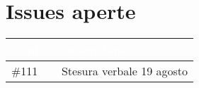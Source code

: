\documentclass{classes/base}
\begin{document}
    \section*{Issues aperte}
    {
        
        \newlength{\freewidth}
        \setlength{\freewidth}{\dimexpr\textwidth-10\tabcolsep}
        \renewcommand{\arraystretch}{1.5}
        \centering
        \setlength{\aboverulesep}{0pt}
        \setlength{\belowrulesep}{0pt}
        \begin{longtable}{C{.13\freewidth} C{\freewidth}}
            \toprule
        \textcolor{white}{\textbf{Codice}}&
        \textcolor{white}{\textbf{Descrizione}}\\	
        \toprule
        \endhead
        
        \#111 & Stesura verbale 19 agosto \\

        \bottomrule
        \end{longtable}
    }
\end{document}
